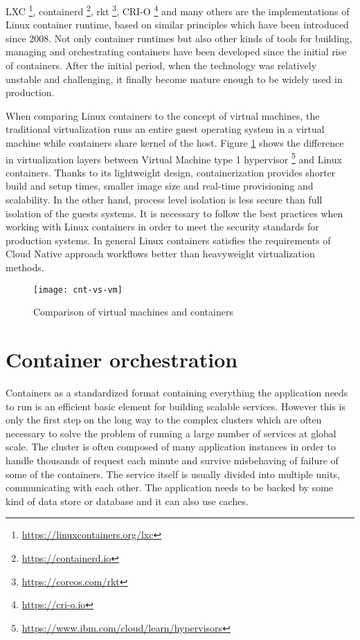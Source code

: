 \documentclass[
  digital, %
  twoside, %
  table,   %
  lof,     %
  lot,     %
]{fithesis3}
\begin{document}
LXC \footnote{\url{https://linuxcontainers.org/lxc}}, containerd \footnote{\url{https://containerd.io}}, rkt \footnote{\url{https://coreos.com/rkt}}, CRI-O \footnote{\url{https://cri-o.io}} and many others are the implementations of Linux container runtime, based on similar principles which have been introduced since 2008. Not only container runtimes but also other kinds of tools for building, managing and orchestrating containers have been developed since the initial rise of containers. After the initial period, when the technology was relatively unstable and challenging, it finally become mature enough to be widely used in production.

When comparing Linux containers to the concept of virtual machines, the traditional virtualization runs an entire guest operating system in a virtual machine while containers share kernel of the host. Figure \ref{fig:cnt-vs-vm} shows the difference in virtualization layers between Virtual Machine type 1 hypervisor \footnote{\url{https://www.ibm.com/cloud/learn/hypervisors}} and Linux containers. Thanks to its lightweight design, containerization provides shorter build and setup times, smaller image size and real-time provisioning and scalability. In the other hand, process level isolation is less secure than full isolation of the guests systems. It is necessary to follow the best practices when working with Linux containers in order to meet the security standards for production systems. In general Linux containers satisfies the requirements of Cloud Native approach workflows better than heavyweight virtualization methods.

\begin{figure}[H]
\caption{Comparison of virtual machines and containers}
\centering
\texttt{[image: cnt-vs-vm]}
\label{fig:cnt-vs-vm}
\end{figure}

\section{Container orchestration} \label{sec:orchestration}
Containers as a standardized format containing everything the application needs to run is an efficient basic element for building scalable services. However this is only the first step on the long way to the complex clusters which are often necessary to solve the problem of running a large number of services at global scale. The cluster is often composed of many application instances in order to handle thousands of request each minute and survive misbehaving of failure of some of the containers. The service itself is usually divided into multiple units, communicating with each other. The application needs to be backed by some kind of data store or database and it can also use caches.
\end{document}
